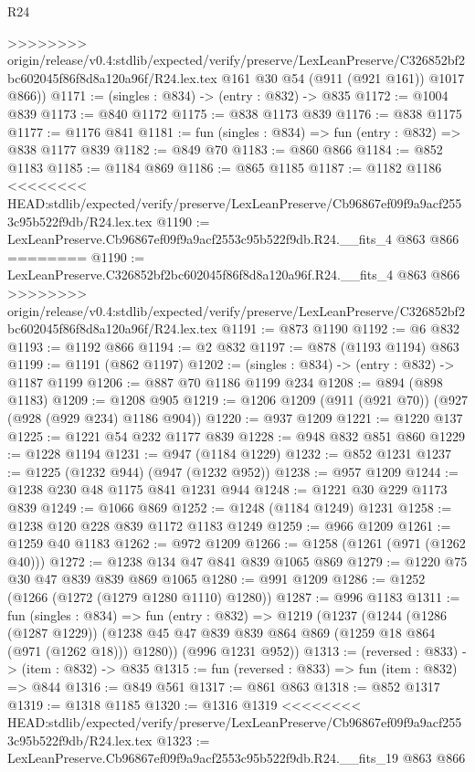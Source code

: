 \begin{lexlean}{R24}
\begin{coremodule}
{{{{{{{{{{{{{{{{{{{{{{{{{{{{{{{{{{{>>>>>>>> origin/release/v0.4:stdlib/expected/verify/preserve/LexLeanPreserve/C326852bf2bc602045f86f8d8a120a96f/R24.lex.tex
        @161
        @30
        @54
        (@911 (@921 @161))
        @1017
        @866))
@1171 := (singles : @834) -> (entry : @832) -> @835
@1172 := @1004 @839
@1173 := @840 @1172
@1175 := @838 @1173 @839
@1176 := @838 @1175
@1177 := @1176 @841
@1181 := fun (singles : @834) => fun (entry : @832) => @838 @1177 @839
@1182 := @849 @70
@1183 := @860 @866
@1184 := @852 @1183
@1185 := @1184 @869
@1186 := @865 @1185
@1187 := @1182 @1186
<<<<<<<< HEAD:stdlib/expected/verify/preserve/LexLeanPreserve/Cb96867ef09f9a9acf2553c95b522f9db/R24.lex.tex
@1190 := LexLeanPreserve.Cb96867ef09f9a9acf2553c95b522f9db.R24.__fits_4 @863 @866
========
@1190 := LexLeanPreserve.C326852bf2bc602045f86f8d8a120a96f.R24.__fits_4 @863 @866
>>>>>>>> origin/release/v0.4:stdlib/expected/verify/preserve/LexLeanPreserve/C326852bf2bc602045f86f8d8a120a96f/R24.lex.tex
@1191 := @873 @1190
@1192 := @6 @832
@1193 := @1192 @866
@1194 := @2 @832
@1197 := @878 (@1193 @1194) @863
@1199 := @1191 (@862 @1197)
@1202 := (singles : @834) -> (entry : @832) -> @1187 @1199
@1206 := @887 @70 @1186 @1199 @234
@1208 := @894 (@898 @1183)
@1209 := @1208 @905
@1219 := @1206 @1209 (@911 (@921 @70)) (@927 (@928 (@929 @234) @1186 @904))
@1220 := @937 @1209
@1221 := @1220 @137
@1225 := @1221 @54 @232 @1177 @839
@1228 := @948 @832 @851 @860
@1229 := @1228 @1194
@1231 := @947 (@1184 @1229)
@1232 := @852 @1231
@1237 := @1225 (@1232 @944) (@947 (@1232 @952))
@1238 := @957 @1209
@1244 := @1238 @230 @48 @1175 @841 @1231 @944
@1248 := @1221 @30 @229 @1173 @839
@1249 := @1066 @869
@1252 := @1248 (@1184 @1249) @1231
@1258 := @1238 @120 @228 @839 @1172 @1183 @1249
@1259 := @966 @1209
@1261 := @1259 @40 @1183
@1262 := @972 @1209
@1266 := @1258 (@1261 (@971 (@1262 @40)))
@1272 := @1238 @134 @47 @841 @839 @1065 @869
@1279 := @1220 @75 @30 @47 @839 @839 @869 @1065
@1280 := @991 @1209
@1286 := @1252 (@1266 (@1272 (@1279 @1280 @1110) @1280))
@1287 := @996 @1183
@1311 := fun (singles : @834) =>
  fun (entry : @832) =>
  @1219
    (@1237
      (@1244
        (@1286 (@1287 @1229))
        (@1238 @45 @47 @839 @839 @864 @869 (@1259 @18 @864 (@971 (@1262 @18))) @1280))
      (@996 @1231 @952))
@1313 := (reversed : @833) -> (item : @832) -> @835
@1315 := fun (reversed : @833) => fun (item : @832) => @844
@1316 := @849 @561
@1317 := @861 @863
@1318 := @852 @1317
@1319 := @1318 @1185
@1320 := @1316 @1319
<<<<<<<< HEAD:stdlib/expected/verify/preserve/LexLeanPreserve/Cb96867ef09f9a9acf2553c95b522f9db/R24.lex.tex
@1323 := LexLeanPreserve.Cb96867ef09f9a9acf2553c95b522f9db.R24.__fits_19 @863 @866
}}}}}}}}}}}}}}}}}}}}}}}}}}}}}}}}}}}
\end{coremodule}
\end{lexlean}
